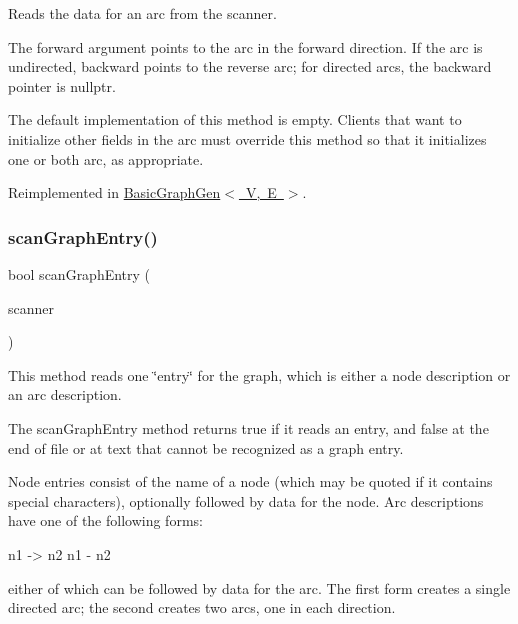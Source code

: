 Reads the data for an arc from the scanner. 

The {\ttfamily forward} argument points to the arc in the forward direction. If the arc is undirected, {\ttfamily backward} points to the reverse arc; for directed arcs, the {\ttfamily backward} pointer is {\ttfamily nullptr}.

The default implementation of this method is empty. Clients that want to initialize other fields in the arc must override this method so that it initializes one or both arc, as appropriate. 

Reimplemented in \mbox{\hyperlink{classBasicGraphGen_a4314b3b6bda0755a87e49070edd17c3d}{Basic\+Graph\+Gen$<$ V, E $>$}}.

\mbox{\label{classGraph_a1c4e1a05a40013ce4e4bb539d05b9937}} 
\subsubsection{\texorpdfstring{scan\+Graph\+Entry()}{scanGraphEntry()}}
{\footnotesize\ttfamily bool scan\+Graph\+Entry (\begin{DoxyParamCaption}\item[{\mbox{\hyperlink{classTokenScanner}{Token\+Scanner}} \&}]{scanner }\end{DoxyParamCaption})\hspace{0.3cm}{\ttfamily [virtual]}}



This method reads one \char`\"{}entry\char`\"{} for the graph, which is either a node description or an arc description. 

The {\ttfamily scan\+Graph\+Entry} method returns {\ttfamily true} if it reads an entry, and {\ttfamily false} at the end of file or at text that cannot be recognized as a graph entry.

Node entries consist of the name of a node (which may be quoted if it contains special characters), optionally followed by data for the node. Arc descriptions have one of the following forms\+:


\begin{DoxyPre}
n1 -> n2
n1 - n2
\end{DoxyPre}


either of which can be followed by data for the arc. The first form creates a single directed arc; the second creates two arcs, one in each direction.

